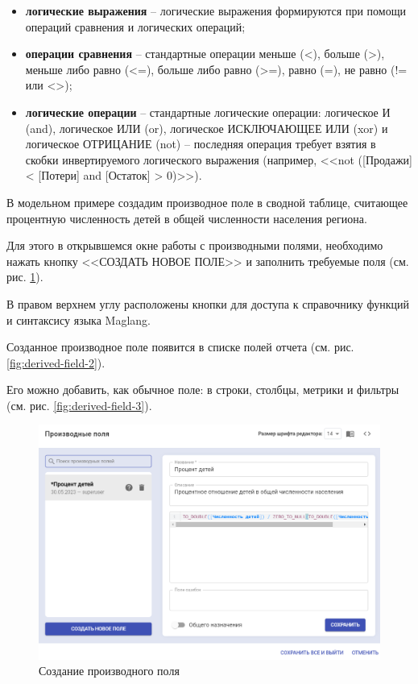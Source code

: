 \documentclass[../user-manual.tex]{subfiles}
\begin{document}
\begin{itemize}
		\item \textbf{логические выражения} -- логические выражения формируются при помощи операций сравнения и логических операций;
		
		\item \textbf{операции сравнения} -- стандартные операции меньше (<), больше (>), меньше либо равно (<=), больше либо равно (>=), равно (=), не равно (!= или <>);
		
		\item \textbf{логические операции} -- стандартные логические операции: логическое И (and), логическое ИЛИ (or), логическое ИСКЛЮЧАЮЩЕЕ ИЛИ (xor) и логическое ОТРИЦАНИЕ (not) -- последняя операция требует взятия в скобки инвертируемого логического выражения (например, <<not ([Продажи] < [Потери] and [Остаток] > 0)>>).
		
	\end{itemize}

	\begin{modelExample}
	В модельном примере создадим производное поле в сводной таблице, считающее процентную численность детей в общей численности населения региона.		
	
	
	Для этого в открывшемся окне работы с производными полями, необходимо нажать кнопку <<СОЗДАТЬ НОВОЕ ПОЛЕ>> и заполнить требуемые поля (см. рис. \ref{fig:derived-field}).
	
	В правом верхнем углу расположены кнопки для доступа к справочнику функций и синтаксису языка Maglang.
	
	
	Созданное производное поле появится в списке полей отчета (см. рис. \ref{fig:derived-field-2}). 
	
	Его можно добавить, как обычное поле: в строки, столбцы, метрики и фильтры (см. рис. \ref{fig:derived-field-3}).
	\end{modelExample}

	\begin{figure}[h]
		\centering
		\includegraphics[width=\graphicswidth]{img/8-deriver-field.png}
		\caption{Создание производного поля}
		\label{fig:derived-field}
	\end{figure}
\end{document}
